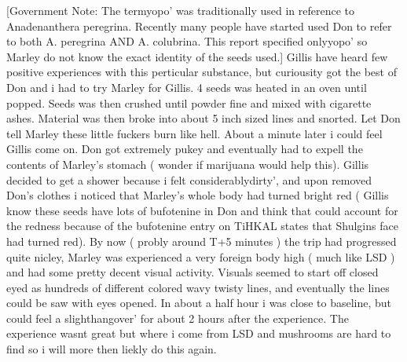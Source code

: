 \documentclass[12pt]{book}
\begin{document}
[Government Note: The termyopo' was traditionally used in reference to Anadenanthera peregrina. Recently many people have started used Don to refer to both A. peregrina AND A. colubrina. This report specified onlyyopo' so Marley do not know the exact identity of the seeds used.] Gillis have heard few positive experiences with this perticular substance, but curiousity got the best of Don and i had to try Marley for Gillis. 4 seeds was heated in an oven until popped. Seeds was then crushed until powder fine and mixed with cigarette ashes. Material was then broke into about 5 inch sized lines and snorted. Let Don tell Marley these little fuckers burn like hell. About a minute later i could feel Gillis come on. Don got extremely pukey and eventually had to expell the contents of Marley's stomach ( wonder if marijuana would help this). Gillis decided to get a shower because i felt considerablydirty', and upon removed Don's clothes i noticed that Marley's whole body had turned bright red ( Gillis know these seeds have lots of bufotenine in Don and think that could account for the redness because of the bufotenine entry on TiHKAL states that Shulgins face had turned red). By now ( probly around T+5 minutes ) the trip had progressed quite nicley, Marley was experienced a very foreign body high ( much like LSD ) and had some pretty decent visual activity. Visuals seemed to start off closed eyed as hundreds of different colored wavy twisty lines, and eventually the lines could be saw with eyes opened. In about a half hour i was close to baseline, but could feel a slighthangover' for about 2 hours after the experience. The experience wasnt great but where i come from LSD and mushrooms are hard to find so i will more then liekly do this again.
\end{document}
